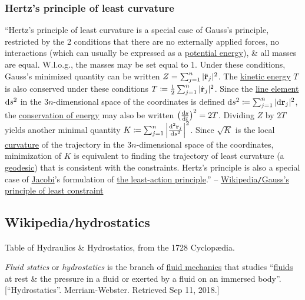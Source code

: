 \documentclass{article}
\begin{document}
\subsubsection{Hertz's principle of least curvature}
``Hertz's principle of least curvature is a special case of Gauss's principle, restricted by the 2 conditions that there are no externally applied forces, no interactions (which can usually be expressed as a \href{https://en.wikipedia.org/wiki/Potential_energy}{potential energy}), \& all masses are equal. W.l.o.g., the masses may be set equal to 1. Under these conditions, Gauss's minimized quantity can be written $Z = \sum_{j=1}^n |\ddot{\bf r}_j|^2$. The \href{https://en.wikipedia.org/wiki/Kinetic_energy}{kinetic energy} $T$ is also conserved under these conditions $T\coloneqq\frac{1}{2}\sum_{j=1}^n |\dot{\bf r}_j|^2$. Since the \href{https://en.wikipedia.org/wiki/Line_element}{line element} ${\rm d}s^2$ in the $3n$-dimensional space of the coordinates is defined ${\rm d}s^2\coloneqq\sum_{j=1}^n |{\rm d}{\bf r}_j|^2$, the \href{https://en.wikipedia.org/wiki/Conservation_of_energy}{conservation of energy} may also be written $\left(\frac{{\rm d}s}{{\rm d}t}\right)^2 = 2T$. Dividing $Z$ by $2T$ yields another minimal quantity $K\coloneqq\sum_{j=1}^n \left|\frac{{\rm d}^2{\bf r}_j}{{\rm d}s^2}\right|^2$. Since $\sqrt{K}$ is the local \href{https://en.wikipedia.org/wiki/Curvature}{curvature} of the trajectory in the $3n$-dimensional space of the coordinates, minimization of $K$ is equivalent to finding the trajectory of least curvature (a \href{https://en.wikipedia.org/wiki/Geodesic}{geodesic}) that is consistent with the constraints. Hertz's principle is also a special case of \href{https://en.wikipedia.org/wiki/Carl_Gustav_Jakob_Jacobi}{Jacobi}'s formulation of \href{https://en.wikipedia.org/wiki/Maupertuis%27_principle}{the least-action principle}.'' -- \href{https://en.wikipedia.org/wiki/Gauss's_principle_of_least_constraint}{Wikipedia{\tt/}Gauss's principle of least constraint}


\subsection{Wikipedia{\tt/}hydrostatics}
{\sf Table of Hydraulics \& Hydrostatics, from the 1728 Cyclop\ae dia.}

%
{\it Fluid statics} or {\it hydrostatics} is the branch of \href{https://en.wikipedia.org/wiki/Fluid_mechanics}{fluid mechanics} that studies ``\href{https://en.wikipedia.org/wiki/Fluid}{fluids} at rest \& the pressure in a fluid or exerted by a fluid on an immersed body''.[``Hydrostatics''. Merriam-Webster. Retrieved Sep 11, 2018.]
\end{document}
